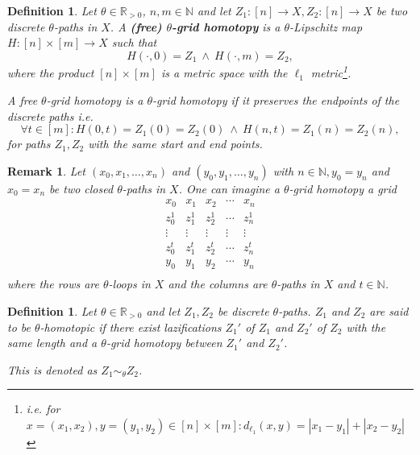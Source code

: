 \documentclass[a4paper, 11pt, twoside]{article}
\newcommand{\R}[0]{\mathbb{R}}
\newcommand{\N}[0]{\mathbb{N}}
\theoremstyle{break}
\theoremstyle{break}
\newtheorem{defin}[thm]{Definition}
\newtheorem{rem}[thm]{Remark}
\begin{document}
\begin{defin}
  Let $\theta \in \R_{>0}$, $n,m \in \N$ and let $Z_1\colon [n] \to X, Z_2: [n] \to X$ be two discrete $\theta$-paths in $X$. 
  A \textbf{(free) $\theta$-grid homotopy} is a $\theta$-Lipschitz map $H\colon [n] \times [m] \to X$ such that
  \begin{equation*}
    H(\cdot, 0) = Z_1 \: \land \: H(\cdot, m) = Z_2,
  \end{equation*}
  where the product $[n] \times [m]$ is a metric space with the $\ell_1$ metric\footnote{i.e. for $x = (x_1, x_2), y = (y_1, y_2) \in [n] \times [m]\colon d_{\ell_1}(x, y) = |x_1 - y_1| + |x_2 - y_2|$}.

  A free $\theta$-grid homotopy is a $\theta$-grid homotopy if it preserves the endpoints of the discrete paths i.e.
  \begin{equation*}
    \forall t\in [m]\colon H(0,t) = Z_1(0) = Z_2(0) \: \land \: H(n,t) = Z_1(n) = Z_2(n),
  \end{equation*}
  for paths $Z_1, Z_2$ with the same start and end points.

  \cite[p. 3]{vigolo2018fundamental}
\end{defin}

\begin{rem}
  Let $(x_0, x_1, \ldots, x_n)$ and $(y_0, y_1, \ldots, y_n)$ with $n \in \N, y_0 = y_n$ and $x_0 = x_n$ be two closed $\theta$-paths in $X$. 
  One can imagine a $\theta$-grid homotopy a grid
  \begin{equation*}
    \begin{matrix}
      x_0 & x_1 & x_2 & \cdots & x_n \\
      z_0^1 & z_1^1 & z_2^1 & \cdots & z_n^1 \\
      \vdots & \vdots & \vdots & \vdots & \vdots \\
      z_0^{t} & z_1^{t} & z_2^{t} & \cdots & z_n^{t} \\
      y_0 & y_1 & y_2 & \cdots & y_n \\
    \end{matrix}
  \end{equation*}
  where the rows are $\theta$-loops in $X$ and the columns are $\theta$-paths in $X$ and $t\in \N$.

  \cite[p. 3, Def. 2.2]{barcelo2014discrete}
\end{rem}

\begin{defin}
  Let $\theta \in \R_{>0}$ and let $Z_1, Z_2$ be discrete $\theta$-paths. $Z_1$ and $Z_2$ are said to be $\theta$-homotopic 
  if there exist lazifications $Z_1'$ of $Z_1$ and $Z_2'$ of $Z_2$ with the same length and a $\theta$-grid homotopy between $Z_1'$ and $Z_2'$.
  
  This is denoted as $Z_1 \sim_{\theta} Z_2$.

  \cite[p. 3, Def. 2.2]{vigolo2018fundamental}
\end{defin}
\end{document}
